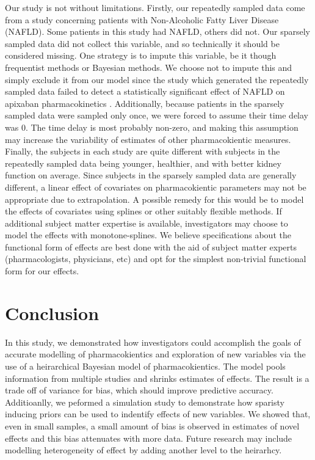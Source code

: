 Our study is not without limitations.  Firstly, our repeatedly sampled data come from a study concerning patients with Non-Alcoholic Fatty Liver Disease (NAFLD).  Some patients in this study had NAFLD, others did not.  Our sparsely sampled data did not collect this variable, and so technically it should be considered missing.  One strategy is to impute this variable, be it though frequentist methods or Bayesian methods.  We choose not to impute this and simply exclude it from our model since the study which generated the repeatedly sampled data failed to detect a statistically significant effect of NAFLD on apixaban pharmacokinetics \cite{tirona2018apixaban}. Additionally, because patients in the sparsely sampled data were sampled only once, we were forced to assume their time delay was 0.  The time delay is most probably non-zero, and making this assumption may increase the variability of estimates of other pharmacokientic measures.  Finally, the subjects in each study are quite different with subjects in the repeatedly sampled data being younger, healthier, and with better kidney function on average. Since subjects in the sparsely sampled data are generally different, a linear effect of covariates on pharmacokientic parameters may not be appropriate due to extrapolation.  A possible remedy for this would be to model the effects of covariates using splines or other suitably flexible methods.  If additional subject matter expertise is available, investigators may choose to model the effects with monotone-splines.  We believe specifications about the functional form of effects are best done with the aid of subject matter experts (pharmacologists, physicians, etc) and opt for the simplest non-trivial functional form for our effects.

\section{Conclusion}


In this study, we demonstrated how investigators could accomplish the goals of accurate modelling of pharmacokientics and exploration of new variables via the use of a heirarchical Bayesian model of pharmacokientics. The model pools information from multiple studies and shrinks estimates of effects.  The result is a trade off of variance for bias, which should improve predictive accuracy.  Additioanlly, we peformed a simulation study to demonstrate how sparisty inducing priors can be used to indentify effects of new variables.  We showed that, even in small samples, a small amount of bias is observed in estimates of novel effects and this bias attenuates with more data. Future research may include modelling heterogeneity of effect by adding another level to the heirarhcy.